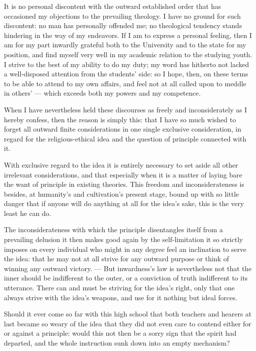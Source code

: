 \documentclass[12pt,a4paper]{book}
\begin{document}
It is no personal discontent with the outward established order that has occasioned my objections to the
prevailing theology. I have no ground for such discontent: no man has personally offended me; no theological
tendency stands hindering in the way of my endeavors. If I am to express a personal feeling, then I am for
my part inwardly grateful both to the University and to the state for my position, and find myself very
well in my academic relation to the studying youth. I strive to the best of my ability to do my duty; my
word has hitherto not lacked a well-disposed attention from the
students' side: so I hope, then, on these terms to be able to attend to my own affairs, and feel not at all
called upon to meddle in others' --- which exceeds both my powers and my competence.

When I have nevertheless held these discourses as freely and inconsiderately as I hereby confess, then the
reason is simply this: that I have so much wished to forget all outward finite considerations in one single
exclusive consideration, in regard for the religious-ethical idea and the question of principle connected
with it.

With exclusive regard to the idea it is entirely necessary to set aside all other irrelevant considerations,
and that especially when it is a matter of laying bare the want of principle in existing theories. This
freedom and inconsiderateness is besides, at humanity's and cultivation's present stage, bound up with so
little danger that if anyone will do anything at all for the idea's sake, this is the very least he can do.

The inconsiderateness with which the principle disentangles itself from a prevailing delusion it then makes
good again by the self-limitation it so strictly imposes on every individual who might in any degree feel an
inclination to serve the idea: that he may not at all strive for any outward purpose or think of winning any
outward victory. --- But inwardness's law is nevertheless not that the inner should be indifferent to the
outer, or a conviction of truth indifferent to its utterance. There can and must be striving for the idea's
right, only that one always strive with the idea's weapons, and use for it nothing but ideal forces.

Should it ever come so far with this high school that both teachers and hearers at last became so weary of
the idea that they did not even care to contend either for or against a principle: would this not then be a
sorry sign that the spirit had
departed, and the whole instruction sunk down into an empty mechanism?
\end{document}
